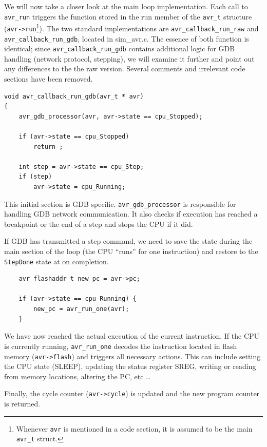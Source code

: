 We will now take a closer look at the main loop implementation. Each call to
\lstinline|avr_run| triggers the function stored in the run member of the \lstinline|avr_t| structure
(\lstinline|avr->run|\footnote{Whenever \lstinline|avr| is mentioned in a code
section, it is assumed to be the main \lstinline|avr_t| struct.}).
The two standard implementations are \lstinline|avr_callback_run_raw| and
\lstinline|avr_callback_run_gdb|, located in sim\_avr.c. The essence of both function is
identical; since \lstinline|avr_callback_run_gdb| contains additional logic for \ac{GDB}
handling (network protocol, stepping), we will examine it further and point out
any differences to the the raw version. Several comments and irrelevant code
sections have been removed.

\begin{lstlisting}
void avr_callback_run_gdb(avr_t * avr)
{
    avr_gdb_processor(avr, avr->state == cpu_Stopped);

    if (avr->state == cpu_Stopped)
        return ;

    int step = avr->state == cpu_Step;
    if (step)
        avr->state = cpu_Running;
\end{lstlisting}

This initial section is \ac{GDB} specific. \lstinline|avr_gdb_processor| is responsible for
handling \ac{GDB} network communication. It also checks if execution has reached a
breakpoint or the end of a step and stops the \ac{CPU} if it did.

If \ac{GDB} has transmitted a step command, we need to save the state during the
main section of the loop (the \ac{CPU} ``runs'' for one instruction) and restore to
the \lstinline|StepDone| state at on completion.

\begin{lstlisting}
    avr_flashaddr_t new_pc = avr->pc;

    if (avr->state == cpu_Running) {
        new_pc = avr_run_one(avr);
    }
\end{lstlisting}

We have now reached the actual execution of the current instruction. If the \ac{CPU}
is currently running, \lstinline|avr_run_one| decodes the instruction located in flash memory
(\lstinline|avr->flash|) and triggers all necessary actions. This can include setting the \ac{CPU}
state (SLEEP), updating the status register \ac{SREG}, writing or reading from memory
locations, altering the \ac{PC}, etc \ldots

Finally, the cycle counter (\lstinline|avr->cycle|) is updated and the new
program counter is returned.

